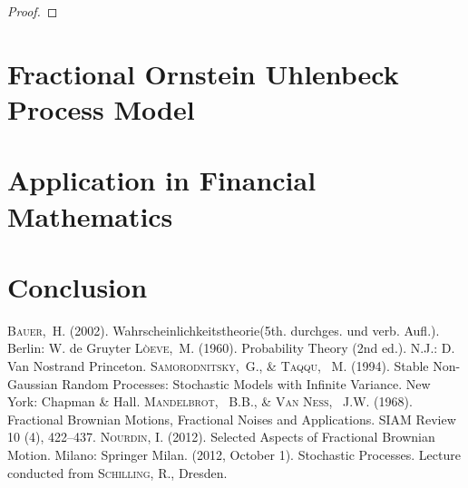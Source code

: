 \documentclass[a4paper, twoside, 11pt]{article}
\theoremstyle{definition}
\begin{document}
\begin{proof}
 \end{proof}
\newpage


\section{Fractional Ornstein Uhlenbeck Process Model}
\setcounter{equation}{0}

\newpage

\section{Application in Financial Mathematics}

\newpage

\section{Conclusion}

\newpage

\fancyhead[LO, RE]{}
\begin{thebibliography}{99}
	 \textsc{Bauer,~H.} (2002). Wahrscheinlichkeitstheorie(5th. durchges. und verb. Aufl.). Berlin: W. de Gruyter
	 \textsc{L\`oeve,~M.} (1960). Probability Theory (2nd ed.). N.J.: D. Van Nostrand Princeton.
	 \textsc{Samorodnitsky,~G., \& Taqqu, ~M.} (1994). Stable Non-Gaussian Random Processes: Stochastic Models with Infinite Variance. New York: Chapman \& Hall.
	 \textsc{Mandelbrot, ~B.B., \& Van Ness, ~J.W.} (1968). Fractional Brownian Motions, Fractional Noises and Applications. SIAM Review 10 (4), 422–437.
	 \textsc{Nourdin, I.} (2012). Selected Aspects of Fractional Brownian Motion. Milano: Springer Milan.
	 (2012, October 1). Stochastic Processes. Lecture conducted from \textsc{Schilling, R.}, Dresden.
\end{thebibliography}
\newpage
\end{document}
